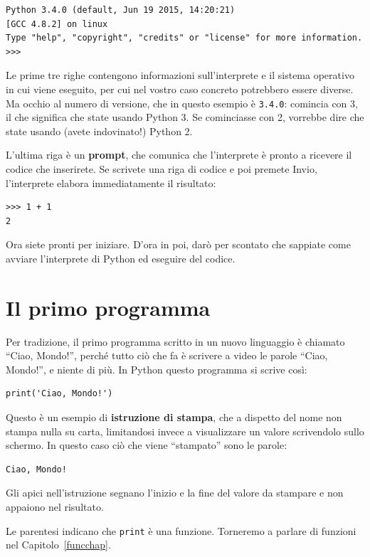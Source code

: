 \documentclass[10pt]{book}
\begin{document}
\begin{verbatim}
Python 3.4.0 (default, Jun 19 2015, 14:20:21)
[GCC 4.8.2] on linux
Type "help", "copyright", "credits" or "license" for more information.
>>>
\end{verbatim}
%
Le prime tre righe contengono informazioni sull'interprete e il sistema operativo in cui viene eseguito, per cui nel vostro caso concreto potrebbero essere diverse. Ma occhio al numero di versione, che in questo esempio è 
{\tt 3.4.0}: comincia con 3, il che significa che state usando Python 3. Se cominciasse con 2, vorrebbe dire che state usando (avete indovinato!) Python 2.

L'ultima riga è un {\bf prompt}, che comunica che l'interprete è pronto a ricevere il codice che inserirete. Se scrivete una riga di codice e poi premete Invio, l'interprete elabora immediatamente il risultato:

\begin{verbatim}
>>> 1 + 1
2
\end{verbatim}
%
Ora siete pronti per iniziare. D'ora in poi, darò per scontato che sappiate come avviare l'interprete di Python ed eseguire del codice.

\section{Il primo programma}
\label{hello}

Per tradizione, il primo programma scritto in un nuovo linguaggio è
chiamato ``Ciao, Mondo!'', perché tutto ciò che fa è scrivere a video le parole ``Ciao, Mondo!'', e niente di più. In Python questo programma si scrive così:

\begin{verbatim}
print('Ciao, Mondo!')
\end{verbatim}
%
Questo è un esempio di {\bf istruzione di stampa}, che a dispetto del nome non stampa nulla su carta, limitandosi invece a visualizzare un valore scrivendolo sullo schermo. In questo caso ciò che viene ``stampato'' sono le parole:

\begin{verbatim}
Ciao, Mondo!
\end{verbatim}
%
Gli apici nell'istruzione segnano l'inizio e la fine del valore da stampare e non appaiono nel risultato.

Le parentesi indicano che {\tt print} è una funzione. Torneremo a parlare di funzioni nel Capitolo~\ref{funcchap}.
\end{document}
